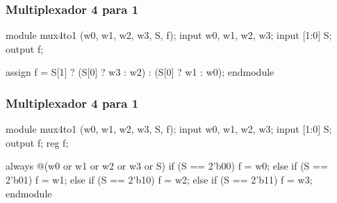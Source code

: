 
\begin{frame}[fragile]
	\frametitle{Multiplexador 4 para 1}
	\begin{verilogcode}
module mux4to1 (w0, w1, w2, w3, S, f);
  input w0, w1, w2, w3;
  input [1:0] S;
  output f;

  assign f = S[1] ? (S[0] ? w3 : w2) : (S[0] ? w1 : w0); 
endmodule
	\end{verilogcode} 
\end{frame}

\begin{frame}[fragile]
	\frametitle{Multiplexador 4 para 1}
	\begin{verilogcode}
module mux4to1 (w0, w1, w2, w3, S, f); 
  input w0, w1, w2, w3;
  input [1:0] S;
  output f;
  reg f;

  always @(w0 or w1 or w2 or w3 or S) 
    if (S == 2'b00)
      f = w0;
    else if (S == 2'b01)
      f = w1;
    else if (S == 2'b10)
      f = w2;
    else if (S == 2'b11)
      f = w3;
endmodule
	\end{verilogcode} 
\end{frame}


